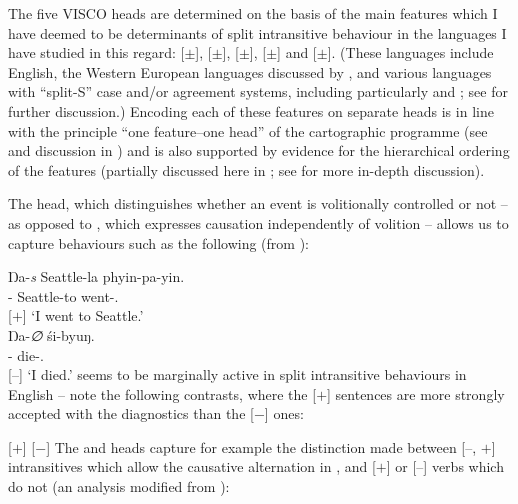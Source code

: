 \documentclass[output=paper]{langsci/langscibook}
\begin{document}
The five VISCO heads are determined on the basis of the main features which I
have deemed to be determinants of split intransitive behaviour in the languages
I have studied in this regard: [$\pm$\Volition{}], [$\pm$\Initiation{}],
[$\pm$\State{}], [$\pm$\Change{}] and [$\pm$\Oriented{}]. (These languages include
English, the Western European languages discussed by \citet{Sorace2000}, and
various languages with \enquote{split-S} case and/or agreement systems,
including particularly  and ; see
\citealt{Baker2016,Baker2018,Baker2019} for further discussion.) Encoding each
of these features on separate heads is in line with the principle \enquote{one
feature–one head} of the cartographic programme (see
\citealt{vanCraenenbroeck2009} and discussion in \citealt{Baker2018}) and is
also supported by evidence for the hierarchical ordering of the features
(partially discussed here in ; see \citealt{Baker2018} for more in-depth
discussion).

The \Volition{} head, which distinguishes whether an event is volitionally
controlled or not – as opposed to \Initiation{}, which expresses causation
independently of volition – allows us to capture behaviours such as the
following (from ):

\ea {} \parencite[132]{DeLancey1984}
    \ea
        \gll Ŋa-\textit{s} Seattle-la phyin-pa-yin.\\
        \Fsg-\Erg{}  Seattle-to  went-\Prf.\Vol\\ \hfill [$+$\Volition{}]
        \glt \enquote*{I went to Seattle.}\\
    \ex
        \gll Ŋa-\textit{∅} śi-byuŋ.\\
        \Fsg-\Abs{}    die-\Prf.\Invol\\ \hfill[$–$\Volition{}]
        \glt \enquote*{I died.}
    \z
\z
\Volition{} seems to be marginally active in split intransitive behaviours in
English -- note the following contrasts, where the [$+$\Volition{}] sentences are
more strongly accepted with the diagnostics than the [$-$\Volition{}] ones:

\ea
    \z
\z

\ea
    \ea {}[$+$\Volition{}]
        \z
    \ex {}[$-$\Volition{}]
        \z
    \z
\z
The \Initiation{} and \Change{} heads capture for example the distinction made
between [$–$\Initiation{}, $+$\Change{}] intransitives which allow the causative
alternation in , and [$+$\Initiation{}] or [$–$\Change{}] verbs which do not
(an analysis modified from \citealt{Ramchand2008}):
\end{document}
